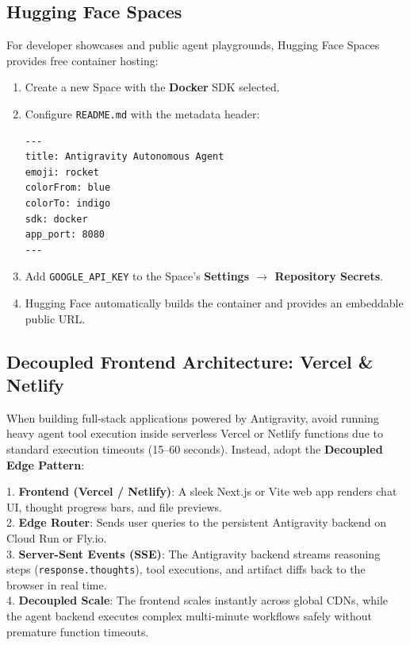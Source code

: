 \documentclass[11pt,a4paper,oneside]{book}
\begin{document}
\subsection{Hugging Face Spaces}
For developer showcases and public agent playgrounds, Hugging Face Spaces provides free container hosting:
\begin{enumerate}
    \item Create a new Space with the \textbf{Docker} SDK selected.
    \item Configure \texttt{README.md} with the metadata header:
\begin{lstlisting}[language=bash]
---
title: Antigravity Autonomous Agent
emoji: rocket
colorFrom: blue
colorTo: indigo
sdk: docker
app_port: 8080
---
\end{lstlisting}
    \item Add \texttt{GOOGLE\_API\_KEY} to the Space's \textbf{Settings $\rightarrow$ Repository Secrets}.
    \item Hugging Face automatically builds the container and provides an embeddable public URL.
\end{enumerate}

\subsection{Decoupled Frontend Architecture: Vercel \& Netlify}
When building full-stack applications powered by Antigravity, avoid running heavy agent tool execution inside serverless Vercel or Netlify functions due to standard execution timeouts (15--60 seconds). Instead, adopt the \textbf{Decoupled Edge Pattern}:

\begin{conceptbox}
1. \textbf{Frontend (Vercel / Netlify)}: A sleek Next.js or Vite web app renders chat UI, thought progress bars, and file previews.\\
2. \textbf{Edge Router}: Sends user queries to the persistent Antigravity backend on Cloud Run or Fly.io.\\
3. \textbf{Server-Sent Events (SSE)}: The Antigravity backend streams reasoning steps (\texttt{response.thoughts}), tool executions, and artifact diffs back to the browser in real time.\\
4. \textbf{Decoupled Scale}: The frontend scales instantly across global CDNs, while the agent backend executes complex multi-minute workflows safely without premature function timeouts.
\end{conceptbox}
\end{document}

